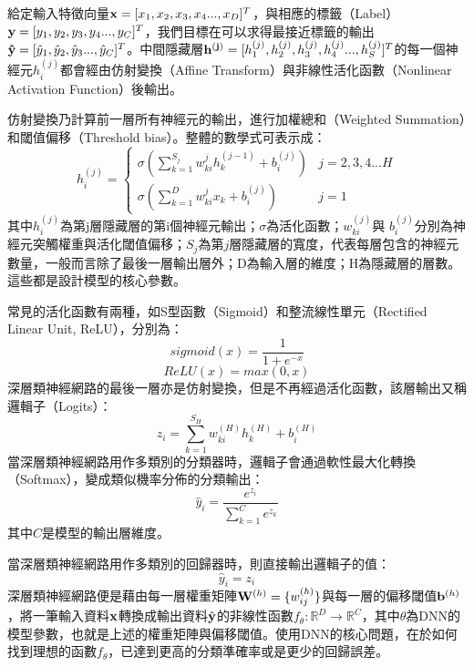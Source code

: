 給定輸入特徵向量$\bold{x} = [x_1 , x_2 , x_3 , x_4 ... , x_D]^T$，與相應的標籤（Label）$\bold{y} = [y_1 , y_2 , y_3 , y_4 ... ,y_C]^T$，我們目標在可以求得最接近標籤的輸出$\bold{\hat{y}} = [\hat{y}_1 , \hat{y}_2 , \hat{y}_3 ... , \hat{y}_C]^T$。中間隱藏層$\bold{h^{(j)}} = [h^{(j)}_1 , h^{(j)}_2 , h^{(j)}_3 , h^{(j)}_4 ... , h^{(j)}_S]^T$的每一個神經元$h^{(j)}_{i}$都會經由仿射變換（Affine Transform）與非線性活化函數（Nonlinear Activation Function）後輸出。

仿射變換乃計算前一層所有神經元的輸出，進行加權總和（Weighted Summation）和閾值偏移（Threshold bias）。整體的數學式可表示成：
\begin{equation}
h^{(j)}_{i} =
\left\{\begin{matrix}
 \sigma (\sum_{k=1}^{S_j} w_{ki}^{j}h_{k}^{(j-1)} + b_{i}^{(j)}) & j = 2 , 3 , 4 ... H \\ 
 \sigma (\sum_{k=1}^{D} w_{ki}^{j}x_{k} + b_{i}^{(j)}) & j = 1 
\end{matrix}\right.
\end{equation}
其中$h_i^{(j)}$為第j層隱藏層的第i個神經元輸出；$\sigma$為活化函數；$w_{ki}^{(j)}$與 $b_{i}^{(j)}$分別為神經元突觸權重與活化閾值偏移；$S_j$為第$j$層隱藏層的寬度，代表每層包含的神經元數量，一般而言除了最後一層輸出層外；D為輸入層的維度；H為隱藏層的層數。這些都是設計模型的核心參數。

常見的活化函數有兩種，如S型函數（Sigmoid）和整流線性單元（Rectified Linear Unit, ReLU），分別為：
\begin{equation}
sigmoid(x) = \frac{1}{1 + e^{-x}}
\end{equation}
\begin{equation}
ReLU(x) = max( 0 , x )
\end{equation}
深層類神經網路的最後一層亦是仿射變換，但是不再經過活化函數，該層輸出又稱邏輯子（Logits）：
\begin{equation}
z_i = \sum_{k=1}^{S_H} w_{ki}^{(H)}h_{k}^{(H)} + b_{i}^{(H)} 
\end{equation}
當深層類神經網路用作多類別的分類器時，邏輯子會通過軟性最大化轉換（Softmax），變成類似機率分佈的分類輸出：
\begin{equation} \label{eq:softmax}
\hat{y}_i = \frac{e^{z_i}}{\sum_{k=1}^{C}e^{z_k} }
\end{equation}
其中$C$是模型的輸出層維度。

當深層類神經網路用作多類別的回歸器時，則直接輸出邏輯子的值：
\begin{equation}
\hat{y}_i = z_i 
\end{equation}
深層類神經網路便是藉由每一層權重矩陣$\bold{W}^{(h)} = \{w_{ij}^{(h)}\}$與每一層的偏移閾值$\bold{b}^{(h)}$，將一筆輸入資料$\bold{x}$轉換成輸出資料$\hat{\bold{y}}$的非線性函數$f_{\theta}:\mathbb{R}^D\rightarrow \mathbb{R}^C$，其中$\theta$為DNN的模型參數，也就是上述的權重矩陣與偏移閾值。使用DNN的核心問題，在於如何找到理想的函數$f_{\theta}$，已達到更高的分類準確率或是更少的回歸誤差。
